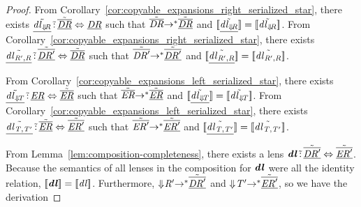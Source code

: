 \documentclass[numbers,10pt,preprint\ifanon ,nocopyrightspace\fi]{sigplanconf}
\begin{document}
\begin{proof}
  From Corollary~\ref{cor:copyable_expansions_right_serialized_star}, there
  exists $\underline{\tilde{\mathit{dl}_{\Downarrow\mkern-4mu \mathit{R}}}}
  \,\tilde{:}\, \underline{\tilde{\overline{\mathit{DR}}}}
  \Leftrightarrow \underline{\mathit{DR}}$ such that $\tilde{\overline{\mathit{DR}}}
  {\rightarrow}^* \underline{\tilde{\overline{\mathit{DR}}}}$ and
  $[ \! [\underline{\tilde{\mathit{dl}_{\Downarrow\mkern-4mu \mathit{R}}}}] \! ] =
  [ \! [\tilde{\mathit{dl}_{\Downarrow\mkern-4mu \mathit{R}}}] \! ]$.
  From Corollary~\ref{cor:copyable_expansions_right_serialized_star}, there
  exists $\underline{\tilde{\mathit{dl}_{\mathit{R}',\mathit{R}}}}
  \,\tilde{:}\, \underline{\tilde{\overline{\mathit{DR}'}}}
  \Leftrightarrow \underline{\tilde{\overline{\mathit{DR}}}}$
  such that $\tilde{\overline{\mathit{DR}'}}
  {\rightarrow}^* \underline{\tilde{\overline{\mathit{DR}'}}}$ and
  $[ \! [\underline{\tilde{\mathit{dl}_{\mathit{R}',\mathit{R}}}}] \! ] =
  [ \! [\tilde{\mathit{dl}_{\mathit{R}',\mathit{R}}}] \! ]$.
  
  From Corollary~\ref{cor:copyable_expansions_left_serialized_star}, there
  exists $\underline{\tilde{\mathit{dl}_{\Downarrow\mkern-4mu \mathit{T}}}}
  \,\tilde{:}\, \underline{\mathit{ER}}
  \Leftrightarrow \underline{\tilde{\overline{\mathit{ER}}}}$ such that
  $\tilde{\overline{\mathit{ER}}}
  {\rightarrow}^* \underline{\tilde{\overline{\mathit{ER}}}}$ and
  $[ \! [\underline{\tilde{\mathit{dl}_{\Downarrow\mkern-4mu \mathit{T}}}}] \! ] =
  [ \! [\tilde{\mathit{dl}_{\Downarrow\mkern-4mu \mathit{T}}}] \! ]$.
  From Corollary~\ref{cor:copyable_expansions_left_serialized_star}, there
  exists $\underline{\tilde{\mathit{dl}_{\mathit{T},\mathit{T}'}}}
  \,\tilde{:}\, \underline{\tilde{\overline{\mathit{ER}}}}
  \Leftrightarrow \underline{\tilde{\overline{\mathit{ER}'}}}$
  such that $\tilde{\overline{\mathit{ER}'}}
  {\rightarrow}^* \underline{\tilde{\overline{\mathit{ER}'}}}$ and
  $[ \! [\underline{\tilde{\mathit{dl}_{\mathit{T},\mathit{T}'}}}] \! ] =
  [ \! [\tilde{\mathit{dl}_{\mathit{T},\mathit{T}'}}] \! ]$.

  From Lemma~\ref{lem:composition-completeness}, there exists a lens
  $\boldsymbol{\mathit{dl}} \,\tilde{:}\,
  \underline{\tilde{\overline{\mathit{DR}'}}} \Leftrightarrow
  \underline{\tilde{\overline{\mathit{ER}'}}}$.  Because the semantics of all
  lenses in the composition for $\boldsymbol{\mathit{dl}}$ were all the identity
  relation, $[ \! [\boldsymbol{\mathit{dl}}] \! ] = [ \! [\mathit{dl}] \! ]$.
  Furthermore,
  $\Downarrow\mkern-4mu \mathit{R}' {\rightarrow}^*
  \underline{\tilde{\overline{\mathit{DR}'}}}$
  and
  $\Downarrow\mkern-4mu \mathit{T}' {\rightarrow}^*
  \underline{\tilde{\overline{\mathit{ER}'}}}$, so we have the derivation
  

\end{proof}
\end{document}
